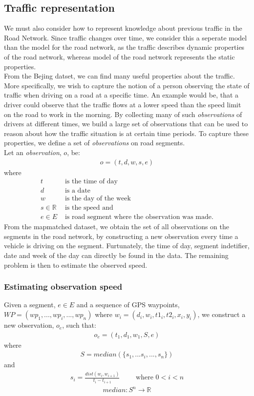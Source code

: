 \subsection{Traffic representation}\label{KR:traffic}
We must also consider how to represent knowledge about previous traffic in the Road Network. Since traffic changes over time, we consider this a seperate model than the model for the road network, as the traffic describes dynamic properties of the road network, whereas model of the road network represents the static properties.\\
From the Bejing datset, we can find many useful properties about the traffic. More specifically, we wish to capture the notion of a person observing the state of traffic when driving on a road at a specific time. An example would be, that a driver could observe that the traffic flows at a lower speed than the speed limit on the road to work in the morning. By collecting many of such \emph{observations} of drivers at different times, we build a large set of observations that can be used to reason about how the traffic situation is at certain time periods. To capture these properties, we define a set of \emph{observations} on road segments.\\
Let an \emph{observation}, $o$, be:
\begin{align*}
o = (t, d, w, s, e)
\end{align*}
where 
\begin{align*}
t &\text{ is the time of day} \\
d &\text{ is a date} \\
w &\text{ is the day of the week} \\
s \in \mathbb{R} &\text{ is the speed and}\\
e \in E &\text{ is road segment where the observation was made.}
\end{align*}
From the mapmatched dataset, we obtain the set of all observations on the segments in the road network, by constructing a new observation every time a vehicle is driving on the segment. Furtunately, the time of day, segment indetifier, date and week of the day can directly be found in the data. The remaining problem is then to estimate the observed speed.

\subsubsection{Estimating observation speed}\label{KR:speed}
Given a segment, $e \in E$ and a sequence of GPS waypoints, $WP=(wp_1,...,wp_i,...,wp_n)$ where $w_i = (d_i, w_i, t1_i, t2_i, x_i, y_i)$, we construct a new observation, $o_e$, such that:
\begin{align*}
o_e = (t_1, d_1, w_1, S, e)
\end{align*}
where
\begin{align*}
S = median(\{s_1,...s_i,...,s_n\})
\end{align*}
and
\begin{align*}
s_i = \frac{dist(w_i, w_{i+1})}{t_i - t_{i+1}} \qquad \text{ where } 0 < i < n
\end{align*}
\begin{align*}
median: S^n \rightarrow \mathbb{R}
\end{align*}